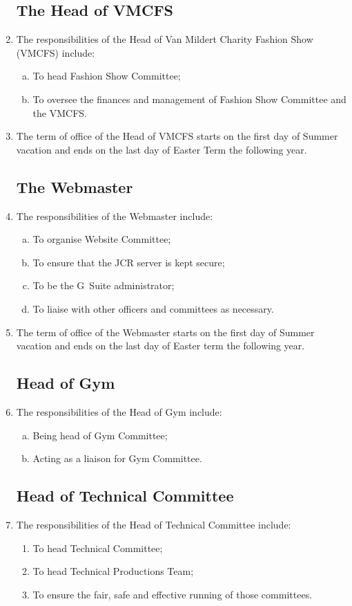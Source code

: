 \documentclass[12pt]{article}
\begin{document}
\begin{enumerate}
    \subsection{The Head of VMCFS}
    \item The responsibilities of the Head of Van Mildert Charity Fashion Show (VMCFS) include:
    \begin{enumerate}[(a)]
        \item To head Fashion Show Committee;
        \item To oversee the finances and management of Fashion Show Committee and the VMCFS.
    \end{enumerate}
    \item The term of office of the Head of VMCFS starts on the first day of Summer vacation and ends on the last day of Easter Term the following year.

    \subsection{The Webmaster}
    \item The responsibilities of the Webmaster include:
    \begin{enumerate}[(a)]
        \item To organise Website Committee;
        \item To ensure that the JCR server is kept secure;
        \item To be the G~Suite administrator;
        \item To liaise with other officers and committees as necessary.
    \end{enumerate}
    \item The term of office of the Webmaster starts on the first day of Summer vacation and ends on the last day of Easter term the following year.

    \subsection{Head of Gym}
    \item The responsibilities of the Head of Gym include:
    \begin{enumerate}[(a)]
        \item Being head of Gym Committee;
        \item Acting as a liaison for Gym Committee.
    \end{enumerate}

    \subsection{Head of Technical Committee}
    \item The responsibilities of the Head of Technical Committee include:
    \begin{enumerate}
        \item To head Technical Committee;
        \item To head Technical Productions Team;
        \item To ensure the fair, safe and effective running of those committees.
    \end{enumerate}


\end{enumerate}
\end{document}
